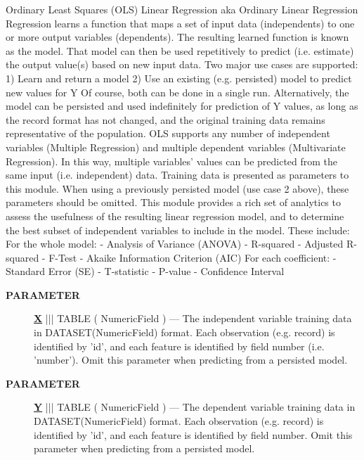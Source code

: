 Ordinary Least Squares (OLS) Linear Regression aka Ordinary Linear Regression Regression learns a function that maps a set of input data (independents) to one or more output variables (dependents). The resulting learned function is known as the model. That model can then be used repetitively to predict (i.e. estimate) the output value(s) based on new input data. Two major use cases are supported: 1) Learn and return a model 2) Use an existing (e.g. persisted) model to predict new values for Y Of course, both can be done in a single run. Alternatively, the model can be persisted and used indefinitely for prediction of Y values, as long as the record format has not changed, and the original training data remains representative of the population. OLS supports any number of independent variables (Multiple Regression) and multiple dependent variables (Multivariate Regression). In this way, multiple variables' values can be predicted from the same input (i.e. independent) data. Training data is presented as parameters to this module. When using a previously persisted model (use case 2 above), these parameters should be omitted. This module provides a rich set of analytics to assess the usefulness of the resulting linear regression model, and to determine the best subset of independent variables to include in the model. These include: For the whole model: - Analysis of Variance (ANOVA) - R-squared - Adjusted R-squared - F-Test - Akaike Information Criterion (AIC) For each coefficient: - Standard Error (SE) - T-statistic - P-value - Confidence Interval






\par
\begin{description}
\item [\colorbox{tagtype}{\color{white} \textbf{\textsf{PARAMETER}}}] \textbf{\underline{X}} ||| TABLE ( NumericField ) --- The independent variable training data in DATASET(NumericField) format. Each observation (e.g. record) is identified by 'id', and each feature is identified by field number (i.e. 'number'). Omit this parameter when predicting from a persisted model.
\item [\colorbox{tagtype}{\color{white} \textbf{\textsf{PARAMETER}}}] \textbf{\underline{Y}} ||| TABLE ( NumericField ) --- The dependent variable training data in DATASET(NumericField) format. Each observation (e.g. record) is identified by 'id', and each feature is identified by field number. Omit this parameter when predicting from a persisted model.
\end{description}









